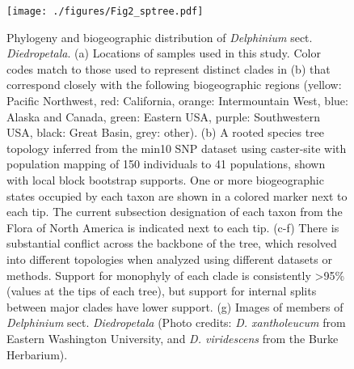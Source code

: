 \documentclass[11pt]{article}
\begin{document}
\begin{figure}[t!]
	\centering
	\texttt{[image: ./figures/Fig2\_sptree.pdf]}
	\caption{
		Phylogeny and biogeographic distribution of \emph{Delphinium} sect. \emph{Diedropetala}.
		(a) Locations of samples used in this study.	Color codes match to those used to 
		represent distinct clades in (b) that correspond closely with the following
		biogeographic regions (yellow: Pacific Northwest, red: California, orange: 
		Intermountain West, blue: Alaska and Canada, green: Eastern USA, purple: 
		Southwestern USA, black: Great Basin, grey: other).
		(b) A rooted species tree topology inferred from the min10 SNP dataset using 
		caster-site with population mapping of 150 individuals to 41 populations, 
		shown with local block bootstrap supports.
		One or more biogeographic states occupied by each taxon are shown in a colored
		marker next to each tip.
		The current subsection designation of each taxon from the Flora of North America is
		indicated next to each tip.
		(c-f) There is substantial conflict across the backbone of the tree, which resolved into
		different topologies when analyzed using different datasets or methods.
		Support for monophyly of each clade is consistently >95\% (values at the tips
		of each tree), but support for internal splits between major clades have lower 
		support.
		(g) Images of members of \emph{Delphinium} sect. \emph{Diedropetala} 
		(Photo credits: \emph{D. xantholeucum} from Eastern Washington University, 
		and \emph{D. viridescens} from the Burke Herbarium).
	}
	\label{fig:sptree}
\end{figure}
\end{document}
